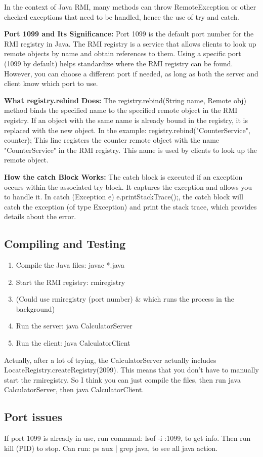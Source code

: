 \documentclass[12pt, letterpaper]{article}
\begin{document}
In the context of Java RMI, many methods can throw RemoteException or 
other checked exceptions that need to be handled, hence the use of try and catch.

\textbf{Port 1099 and Its Significance:} Port 1099 is the default port number 
for the RMI registry in Java. The RMI registry is a service that allows clients to 
look up remote objects by name and obtain references to them. Using a specific 
port (1099 by default) helps standardize where the RMI registry can be found. 
However, you can choose a different port if needed, as long as both the 
server and client know which port to use.

\textbf{What registry.rebind Does:} The registry.rebind(String name, Remote obj) 
method binds the specified name to the specified remote object in the RMI 
registry. If an object with the same name is already bound in the registry, 
it is replaced with the new object. In the example: registry.rebind("CounterService", counter);
This line registers the counter remote object with the name "CounterService" in the 
RMI registry. This name is used by clients to look up the remote object.

\textbf{How the catch Block Works:} The catch block is executed if an exception occurs within 
the associated try block. It captures the exception and allows you to handle it.
In catch (Exception e) {e.printStackTrace();}, the catch block will catch the exception 
(of type Exception) and print the stack trace, which provides details about the error.

\subsection*{Compiling and Testing}
\begin{enumerate}
    \item Compile the Java files: javac *.java
    \item Start the RMI registry: rmiregistry
    \item (Could use rmiregistry (port number) \& which runs the process in the background)
    \item Run the server: java CalculatorServer
    \item Run the client: java CalculatorClient
\end{enumerate}
Actually, after a lot of trying, the CalculatorServer actually includes LocateRegistry.createRegistry(2099). 
This means that you don't have to manually start the rmiregistry. So I think you can just compile the files, 
then run java CalculatorServer, then java CalculatorClient. 

\subsection*{Port issues}
If port 1099 is already in use, run command: lsof -i :1099, to get info. Then run kill (PID) to stop. 
Can run: ps aux | grep java, to see all java action. 
\end{document}
